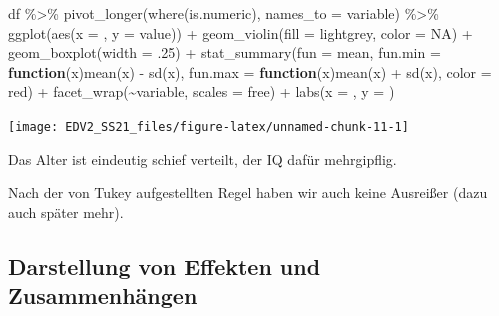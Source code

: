 \documentclass[
]{book}
\newenvironment{Shaded}{\begin{snugshade}}{\end{snugshade}}
\newcommand{\AttributeTok}[1]{\textcolor[rgb]{0.77,0.63,0.00}{#1}}
\newcommand{\ConstantTok}[1]{\textcolor[rgb]{0.00,0.00,0.00}{#1}}
\newcommand{\ControlFlowTok}[1]{\textcolor[rgb]{0.13,0.29,0.53}{\textbf{#1}}}
\newcommand{\DecValTok}[1]{\textcolor[rgb]{0.00,0.00,0.81}{#1}}
\newcommand{\FunctionTok}[1]{\textcolor[rgb]{0.00,0.00,0.00}{#1}}
\newcommand{\NormalTok}[1]{#1}
\newcommand{\SpecialCharTok}[1]{\textcolor[rgb]{0.00,0.00,0.00}{#1}}
\newcommand{\StringTok}[1]{\textcolor[rgb]{0.31,0.60,0.02}{#1}}
\begin{document}
\begin{Shaded}
\begin{Highlighting}[]
\NormalTok{df }\SpecialCharTok{\%\textgreater{}\%} 
  \FunctionTok{pivot\_longer}\NormalTok{(}\FunctionTok{where}\NormalTok{(is.numeric),}
               \AttributeTok{names\_to =} \StringTok{\textquotesingle{}variable\textquotesingle{}}\NormalTok{) }\SpecialCharTok{\%\textgreater{}\%}  
  \FunctionTok{ggplot}\NormalTok{(}\FunctionTok{aes}\NormalTok{(}\AttributeTok{x =} \StringTok{\textquotesingle{}\textquotesingle{}}\NormalTok{, }\AttributeTok{y =}\NormalTok{ value)) }\SpecialCharTok{+}
  \FunctionTok{geom\_violin}\NormalTok{(}\AttributeTok{fill =} \StringTok{\textquotesingle{}lightgrey\textquotesingle{}}\NormalTok{, }\AttributeTok{color =} \ConstantTok{NA}\NormalTok{) }\SpecialCharTok{+}
  \FunctionTok{geom\_boxplot}\NormalTok{(}\AttributeTok{width =}\NormalTok{ .}\DecValTok{25}\NormalTok{) }\SpecialCharTok{+}
  \FunctionTok{stat\_summary}\NormalTok{(}\AttributeTok{fun =}\NormalTok{ mean, }
               \AttributeTok{fun.min =} \ControlFlowTok{function}\NormalTok{(x)}\FunctionTok{mean}\NormalTok{(x) }\SpecialCharTok{{-}} \FunctionTok{sd}\NormalTok{(x), }
               \AttributeTok{fun.max =} \ControlFlowTok{function}\NormalTok{(x)}\FunctionTok{mean}\NormalTok{(x) }\SpecialCharTok{+} \FunctionTok{sd}\NormalTok{(x),}
               \AttributeTok{color =} \StringTok{\textquotesingle{}red\textquotesingle{}}\NormalTok{) }\SpecialCharTok{+}
  \FunctionTok{facet\_wrap}\NormalTok{(}\SpecialCharTok{\textasciitilde{}}\NormalTok{variable, }\AttributeTok{scales =} \StringTok{\textquotesingle{}free\textquotesingle{}}\NormalTok{) }\SpecialCharTok{+}
  \FunctionTok{labs}\NormalTok{(}\AttributeTok{x =} \StringTok{\textquotesingle{}\textquotesingle{}}\NormalTok{,}
       \AttributeTok{y =} \StringTok{\textquotesingle{}\textquotesingle{}}\NormalTok{)}
\end{Highlighting}
\end{Shaded}

\begin{center}\texttt{[image: EDV2\_SS21\_files/figure-latex/unnamed-chunk-11-1]} \end{center}

Das Alter ist eindeutig schief verteilt, der IQ dafür mehrgipflig.

Nach der von Tukey aufgestellten Regel \citep{tukeyExploratoryDataAnalysis1977} haben wir auch keine Ausreißer (dazu auch später mehr).

\hypertarget{darstellung-von-effekten-und-zusammenhuxe4ngen}{%
\subsection{Darstellung von Effekten und Zusammenhängen}\label{darstellung-von-effekten-und-zusammenhuxe4ngen}}
\end{document}
